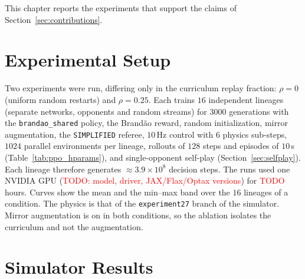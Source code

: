 
This chapter reports the experiments that support the claims of Section~\ref{sec:contributions}.

\section{Experimental Setup}
\label{sec:setup}

Two experiments were run, differing only in the curriculum replay fraction: $\rho=0$ (uniform random restarts) and $\rho=0.25$.  Each trains $16$ independent lineages (separate networks, opponents and random streams) for $3000$ generations
with the \texttt{brandao\_shared} policy, the Brand\~ao reward, random initialization, mirror augmentation, the \texttt{SIMPLIFIED} referee, $10$\,Hz control with $6$ physics sub-steps, $1024$ parallel environments per lineage, rollouts of $128$ steps and episodes of $10$\,s
(Table~\ref{tab:ppo_hparams}), and single-opponent self-play (Section~\ref{sec:selfplay}).  Each lineage therefore generates $\approx 3.9\times10^{8}$ decision steps.  The runs used one NVIDIA GPU (\textcolor{red}{TODO: model, driver, JAX/Flax/Optax versions}) for \textcolor{red}{TODO} hours.
Curves show the mean and the min--max band over the $16$ lineages of a condition.  The physics is that of the \texttt{experiment27} branch of the simulator.
Mirror augmentation is on in both conditions, so the ablation isolates the curriculum and not the augmentation.

\section{Simulator Results}
\label{sec:sim_results}

